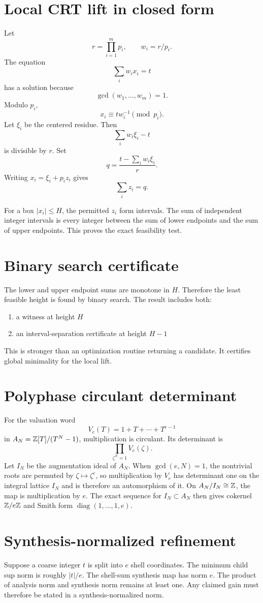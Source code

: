 \section{Local CRT lift in closed form}
Let
\[
 r=\prod_{i=1}^{m}p_i,
 \qquad
 w_i=r/p_i.
\]
The equation
\[
 \sum_iw_ix_i=t
\]
has a solution because
\[
 \gcd(w_1,\ldots,w_m)=1.
\]
Modulo $p_i$,
\[
 x_i\equiv t w_i^{-1}\pmod{p_i}.
\]
Let $\xi_i$ be the centered residue. Then
\[
 \sum_iw_i\xi_i-t
\]
is divisible by $r$. Set
\[
 q=\frac{t-\sum_iw_i\xi_i}{r}.
\]
Writing $x_i=\xi_i+p_i z_i$ gives
\[
 \sum_i z_i=q.
\]

For a box $|x_i|\le H$, the permitted $z_i$ form intervals. The sum of independent integer intervals is every integer between the sum of lower endpoints and the sum of upper endpoints. This proves the exact feasibility test.

\section{Binary search certificate}
The lower and upper endpoint sums are monotone in $H$. Therefore the least feasible height is found by binary search. The result includes both:

\begin{enumerate}[leftmargin=1.5em]
\item a witness at height $H$
\item an interval-separation certificate at height $H-1$
\end{enumerate}

This is stronger than an optimization routine returning a candidate. It certifies global minimality for the local lift.

\section{Polyphase circulant determinant}
For the valuation word
\[
 V_e(T)=1+T+\cdots+T^{e-1}
\]
in $A_N=\mathbb Z[T]/(T^N-1)$, multiplication is circulant. Its determinant is
\[
 \prod_{\zeta^N=1}V_e(\zeta).
\]
Let $I_N$ be the augmentation ideal of $A_N$. When $\gcd(e,N)=1$, the nontrivial roots are permuted by $\zeta\mapsto\zeta^e$, so multiplication by $V_e$ has determinant one on the integral lattice $I_N$ and is therefore an automorphism of it. On $A_N/I_N\cong\mathbb Z$, the map is multiplication by $e$. The exact sequence for $I_N\subset A_N$ then gives cokernel $\mathbb Z/e\mathbb Z$ and Smith form $\operatorname{diag}(1,\ldots,1,e)$.

\section{Synthesis-normalized refinement}
Suppose a coarse integer $t$ is split into $e$ shell coordinates. The minimum child sup norm is roughly $|t|/e$. The shell-sum synthesis map has norm $e$. The product of analysis norm and synthesis norm remains at least one. Any claimed gain must therefore be stated in a synthesis-normalized norm.

